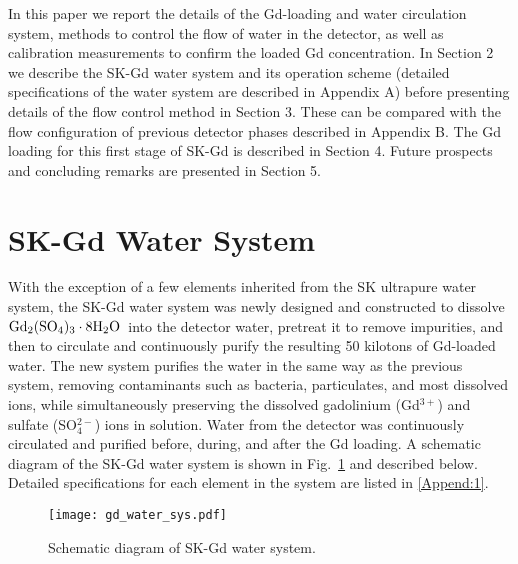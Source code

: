 \documentclass[preprint,12pt]{elsarticle}
\newcommand{\GdSOw}{$\rm Gd_2(\rm SO_4)_3\cdot \rm 8H_2O$\ }
\begin{document}
In this paper we report the details of the Gd-loading and water circulation system, methods to control the flow of water in the detector, as well as calibration measurements to confirm the loaded Gd concentration.
In Section 2 we describe the SK-Gd water system and its operation scheme (detailed specifications of the water system are described in Appendix A) before presenting details of the flow control method in Section 3. 
These can be compared with the flow configuration of previous detector phases described in Appendix B.
The Gd loading for this first stage of SK-Gd is described in Section 4.
Future prospects and concluding remarks are presented in Section 5.


\section{SK-Gd Water System} %
\label{S:2}
With the exception of a few elements inherited from the SK ultrapure water system, the SK-Gd water system was newly designed and constructed to dissolve \GdSOw into the detector water, pretreat it to remove impurities, and then to circulate and continuously purify the resulting 50 kilotons of Gd-loaded water. 
The new system purifies the water in the same way as the previous system, removing contaminants such as bacteria, particulates, and most dissolved ions, while simultaneously preserving the dissolved gadolinium (Gd$^{3+}$) and sulfate (SO$_4^{2-}$) ions in solution.
Water from the detector was continuously circulated and purified before, during, and after the Gd loading. 
A schematic diagram of the SK-Gd water system is shown in Fig.~\ref{fig:gd-water-sys} and described below.
Detailed specifications for each element in the system are listed in \ref{Append:1}.

\begin{figure}[htb!]
\centering\texttt{[image: gd\_water\_sys.pdf]}
\caption{Schematic diagram of SK-Gd water system.}
\label{fig:gd-water-sys}
\end{figure}
\end{document}
